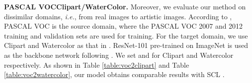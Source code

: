 \documentclass[runningheads]{llncs}
\def\ie{{\em i.e.}}
\begin{document}
{\flushleft \textbf{PASCAL VOCClipart/WaterColor.}} Moreover, we evaluate our method on dissimilar domains, \ie, from real images to artistic images. According to \cite{DBLP:conf/cvpr/SaitoUHS19}, PASCAL VOC \cite{DBLP:journals/ijcv/EveringhamGWWZ10} is the source domain, where the PASCAL VOC 2007 and 2012 training and validation sets are used for training. For the target domain, we use Clipart \cite{DBLP:conf/cvpr/InoueFYA18} and Watercolor \cite{DBLP:conf/cvpr/InoueFYA18} as that in \cite{DBLP:conf/cvpr/SaitoUHS19}. ResNet-101 \cite{DBLP:conf/cvpr/HeZRS16} pre-trained on ImageNet \cite{DBLP:conf/cvpr/DengDSLL009} is used as the backbone network following \cite{DBLP:conf/cvpr/SaitoUHS19,DBLP:journals/corr/abs-1911-02559}. We set  and  for Clipart \cite{DBLP:conf/cvpr/InoueFYA18} and Watercolor \cite{DBLP:conf/cvpr/InoueFYA18} respectively. As shown in Table \ref{table:voc2clipart} and Table \ref{table:voc2watercolor}, our model obtains comparable results with SCL \cite{DBLP:journals/corr/abs-1911-02559}.
\end{document}
